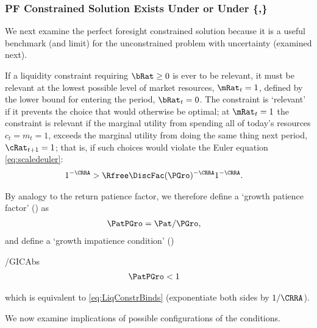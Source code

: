 \documentclass[BufferStockTheory]{subfiles}
\begin{document}
\providecommand{\figName}{RelatePFGICFHWCRICPFFVAC} %
\providecommand{\figFile}{\figName} %
\hypertarget{\figName}{}

\hypertarget{PF-Constrained-Solution}{}
\hypertarget{Constrained-Solution}{}
\subsubsection{PF Constrained Solution Exists Under {\RIC} or Under \{\cncl{\RIC},\GICAbs\}}\label{subsec:PFCon}

We next examine the perfect foresight constrained solution because it is a useful benchmark (and limit) for the unconstrained problem with uncertainty (examined next).

If a liquidity constraint requiring $\bRat \geq 0$ is ever to be relevant, it must be
relevant at the lowest possible level of market resources,
$\mRat_{t}=1$, defined by the lower bound for entering the period, 
$\bRat_{t}=0$.  The constraint is `relevant' if
it prevents the choice that would otherwise be optimal; at
$\mRat_{t}=1$ the constraint is relevant if the marginal utility from spending all of today's
resources $c_{t}=m_{t}=1$, exceeds the marginal utility from
doing the same thing next period, $\cRat_{t+1}=1$; that is, if such
choices would violate the Euler equation \eqref{eq:scaledeuler}:
\begin{align}
  1^{-\CRRA}  & > \Rfree \DiscFac (\PGro)^{-\CRRA}1^{-\CRRA}  \label{eq:LiqConstrBinds}.
\end{align}

\hypertarget{PFGPNew}{}
\hypertarget{GICAbs}{}
By analogy to the return patience factor, we therefore define a `growth patience factor' (\PFGPNew) as
\begin{align}
  \PatPGro  & = {\Pat}/\PGro,  \label{eq:PFGPNew}
\end{align}
and define a `growth impatience condition' (\GICAbs)
\begin{verbatimwrite}{\EqDir/GICAbs}
\begin{align}
  \PatPGro &  < 1   \label{eq:GICAbs}
\end{align}
\end{verbatimwrite}

which is equivalent to \eqref{eq:LiqConstrBinds} (exponentiate both
sides by $1/\CRRA$).

We now examine implications of possible configurations of the conditions.
\end{document}
